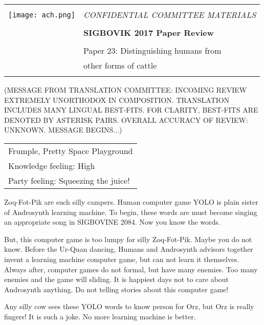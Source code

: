 \documentclass[12pt]{article}
\begin{document}
{\sffamily
\begin{tabular}{ll}
\multirow{3}{*}{\texttt{[image: ach.png]}}\\
& \Large{\em CONFIDENTIAL COMMITTEE MATERIALS} \\
&\\
& \textbf{\Huge{SIGBOVIK 2017 Paper Review}} \\
&\\
& \LARGE{Paper 23: Distinguishing humans from} \\
& \LARGE{other forms of cattle} \\
&\\
\hline
\end{tabular}}
\vspace{2em}
\thispagestyle{empty}

(MESSAGE FROM TRANSLATION COMMITTEE:
INCOMING REVIEW EXTREMELY UNORTHODOX IN COMPOSITION.
TRANSLATION INCLUDES MANY LINGUAL BEST-FITS.
FOR CLARITY, BEST-FITS ARE DENOTED BY ASTERISK PAIRS.
OVERALL ACCURACY OF REVIEW: UNKNOWN.
MESSAGE BEGINS...)

\newcommand\orz[1]{\textasteriskcentered{}#1\textasteriskcentered{}}

{\large\bf
\begin{tabular}{l}
\orz{Frumple}, \orz{Pretty Space Playground} \\
Knowledge feeling: High \\
Party feeling: \orz{Squeezing} the \orz{juice}! \\
\end{tabular}}
\vspace{1em}

Zoq-Fot-Pik are such silly \orz{campers}.
Human computer game YOLO is plain \orz{sister} of Androsynth \orz{learning machine}.
To begin, these words are must become \orz{singing} an appropriate \orz{song} in SIGBOVINE 2084.
Now you know the words.

But, this computer game is too \orz{lumpy} for silly Zoq-Fot-Pik.
Maybe you do not know.
Before the Ur-Quan \orz{dancing},
Humans and Androsynth \orz{advisors} together invent a \orz{learning machine} computer game,
but can not \orz{learn} it themselves.
Always after, computer games do not \orz{formal}, but have many \orz{enemies}.
Too many \orz{enemies} and the game will \orz{sliding}.
It is happiest days not to care about Androsynth anything.
Do not \orz{telling stories} about this computer game!

Any \orz{silly cow} sees these YOLO words to know person for Orz, but Orz is really \orz{fingers}! It is such a joke.
No more \orz{learning machine} is better.
\end{document}

